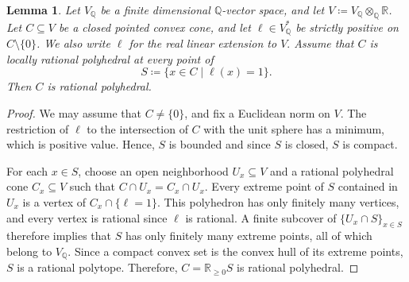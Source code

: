 \documentclass[a4paper,12pt]{amsart}
\newtheorem{lemma}[theorem]{Lemma}
\theoremstyle{plain}
\theoremstyle{definition}
\numberwithin{equation}{section}
\newcommand{\R}{\mathbb{R}}
\newcommand{\Q}{\mathbb{Q}}
\begin{document}
\begin{lemma}\label{lem:fdrvs}
    Let \(V_{\Q}\) be a finite dimensional $\Q$-vector space, and let \(V\coloneqq V_{\Q}\otimes_{\Q} \R\). Let $C\subseteq V$ be a closed pointed convex cone, and let \(\ell\in V_{\Q}^{\ast}\) be strictly positive on \(C\setminus \{0\}\). We also write $\ell$ for the real linear extension to $V.$ Assume that \(C\) is locally rational polyhedral at every point of
    \[
    S\coloneqq \{x\in C\mid \ell(x)=1\}.
    \]
    Then \(C\) is rational polyhedral.
\end{lemma}
\begin{proof}
    We may assume that $C\neq \{0\}$, and fix a Euclidean norm on $V$. The restriction of $\ell$ to the intersection of $C$ with the unit sphere has a minimum, which is positive value. Hence, $S$ is bounded and since $S$ is closed, $S$ is compact.

    For each $x\in S$, choose an open neighborhood $U_x\subseteq V$ and a rational polyhedral cone $C_x\subseteq V$ such that $C\cap U_x=C_x\cap U_x$. Every extreme point of $S$ contained in $U_x$ is a vertex of $C_x\cap \{\ell=1\}$. This polyhedron has only finitely many vertices, and every vertex is rational since $\ell$ is rational. A finite subcover of $\{U_x\cap S\}_{x\in S}$ therefore implies that $S$ has only finitely many extreme points, all of which belong to $V_{\Q}$. Since a compact convex set is the convex hull of its extreme points, $S$ is a rational polytope. Therefore, $C=\R_{\geq 0}S$ is rational polyhedral.
\end{proof}
\end{document}
